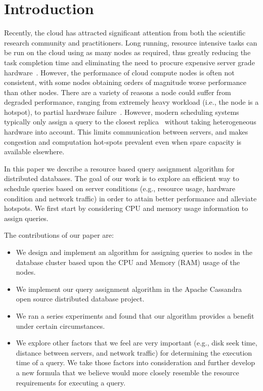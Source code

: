 \section{Introduction}

Recently, the cloud has attracted significant attention from both the scientific research community and practitioners. Long running, resource intensive tasks can be run on the cloud using as many nodes as required, thus greatly reducing the task completion time and eliminating the need to procure expensive server grade hardware~\cite{Agrawal:2008:CRD:1462571.1462573}. However, the performance of cloud compute nodes is often not consistent, with some nodes obtaining orders of magnitude worse performance than other nodes. There are a variety of reasons a node could suffer from degraded performance, ranging from extremely heavy workload (i.e., the node is a hotspot), to partial hardware failure~\cite{citeulike:6656195}. However, modern scheduling systems typically only assign a query to the closest replica~\cite{borthakur-07} without taking heterogeneous hardware into account. This limits communication between servers, and makes congestion and computation hot-spots prevalent even when spare capacity is available elsewhere.

In this paper we describe a resource based query assignment algorithm for distributed databases. The goal of our work is to explore an efficient way to schedule queries based on server conditions (e.g., resource usage, hardware condition and network traffic) in order to attain better performance and alleviate hotspots. We first start by considering CPU and memory usage information to assign queries.

The contributions of our paper are:

\begin{itemize}
\item We design and implement an algorithm for assigning queries to nodes in the database cluster based upon the CPU and Memory (RAM) usage of the nodes.
\item We implement our query assignment algorithm in the Apache Cassandra~\cite{ Lakshman:2010:CDS:1773912.1773922} open source distributed database project.
\item We ran a series experiments and found that our algorithm provides a benefit under certain circumstances.
\item We explore other factors that we feel are very important (e.g., disk seek time, distance between servers, and network traffic) for determining the execution time of a query. We take those factors into consideration and further develop a new formula that we believe would more closely resemble the resource requirements for executing a query.
\end{itemize}
 
